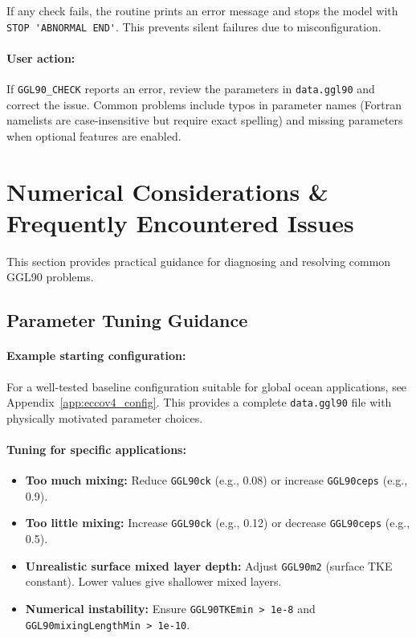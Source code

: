 \documentclass[12pt,letterpaper]{article}
\begin{document}
If any check fails, the routine prints an error message and stops the model with \verb|STOP 'ABNORMAL END'|. This prevents silent failures due to misconfiguration.

\paragraph{User action:} If \verb|GGL90_CHECK| reports an error, review the parameters in \verb|data.ggl90| and correct the issue. Common problems include typos in parameter names (Fortran namelists are case-insensitive but require exact spelling) and missing parameters when optional features are enabled.

\section{Numerical Considerations \& Frequently Encountered Issues}
\label{sec:numerical_issues}

\label{sec:issues}

This section provides practical guidance for diagnosing and resolving common GGL90 problems.

\subsection{Parameter Tuning Guidance}

\paragraph{Example starting configuration:}

For a well-tested baseline configuration suitable for global ocean applications, see Appendix~\ref{app:eccov4_config}. This provides a complete \texttt{data.ggl90} file with physically motivated parameter choices.

\paragraph{Tuning for specific applications:}
\begin{itemize}
\item \textbf{Too much mixing:} Reduce \verb|GGL90ck| (e.g., 0.08) or increase \verb|GGL90ceps| (e.g., 0.9).
\item \textbf{Too little mixing:} Increase \verb|GGL90ck| (e.g., 0.12) or decrease \verb|GGL90ceps| (e.g., 0.5).
\item \textbf{Unrealistic surface mixed layer depth:} Adjust \verb|GGL90m2| (surface TKE constant). Lower values give shallower mixed layers.
\item \textbf{Numerical instability:} Ensure \verb|GGL90TKEmin > 1e-8| and \verb|GGL90mixingLengthMin > 1e-10|.
\end{itemize}
\end{document}
